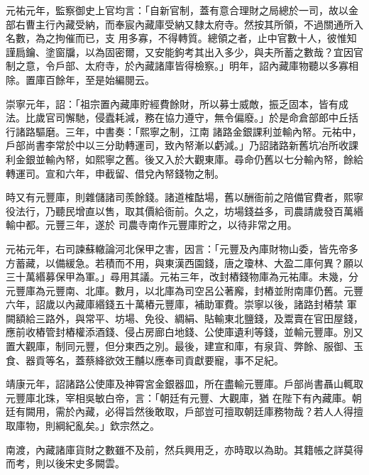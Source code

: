 \begin{pinyinscope}
 元祐元年，監察御史上官均言：「自新官制，蓋有意合理財之局總於一司，故以金部右曹主行內藏受納，而奉宸內藏庫受納又隸太府寺。然按其所領，不過關通所入名數，為之拘催而已，支
 用多寡，不得轉質。總領之者，止中官數十人，彼惟知謹扃鑰、塗窗牖，以為固密爾，又安能鉤考其出入多少，與夫所蓄之數哉？宜因官制之意，令戶部、太府寺，於內藏諸庫皆得檢察。」明年，詔內藏庫物聽以多寡相除。置庫百餘年，至是始編閱云。



 崇寧元年，詔：「祖宗置內藏庫貯經費餘財，所以募士威敵，振乏固本，皆有成法。比歲官司懈馳，侵蠹耗減，務在協力遵守，無令偏廢。」於是命倉部郎中丘括行諸路驅磨。三年，中書奏：「熙寧之制，江南
 諸路金銀課利並輸內帑。元祐中，戶部尚書李常於中以三分助轉運司，致內帑漸以虧減。」乃詔諸路新舊坑冶所收課利金銀並輸內帑，如熙寧之舊。後又入於大觀東庫。尋命仍舊以七分輸內帑，餘給轉運司。宣和六年，申截留、借兌內帑錢物之制。



 時又有元豐庫，則雜儲諸司羨餘錢。諸道榷酤場，舊以酬衙前之陪備官費者，熙寧役法行，乃聽民增直以售，取其價給衙前。久之，坊場錢益多，司農請歲發百萬緡輸中都。元豐三年，遂於
 司農寺南作元豐庫貯之，以待非常之用。



 元祐元年，右司諫蘇轍論河北保甲之害，因言：「元豐及內庫財物山委，皆先帝多方蓄藏，以備緩急。若積而不用，與東漢西園錢，唐之瓊林、大盈二庫何異？願以三十萬緡募保甲為軍。」尋用其議。元祐三年，改封樁錢物庫為元祐庫。未幾，分元豐庫為元豐南、北庫。數月，以北庫為司空呂公著廨，封樁並附南庫仍舊。元豐六年，詔歲以內藏庫緡錢五十萬樁元豐庫，補助軍費。崇寧以後，諸路封樁禁
 軍闕額給三路外，與常平、坊場、免役、綢絹、貼輸東北鹽錢，及鬻賣在官田屋錢，應前收樁管封樁權添酒錢、侵占房廊白地錢、公使庫遺利等錢，並輸元豐庫。別又置大觀庫，制同元豐，但分東西之別。最後，建宣和庫，有泉貨、弊餘、服御、玉食、器貢等名，蓋蔡絳欲效王黼以應奉司貢獻要寵，事不足紀。



 靖康元年，詔諸路公使庫及神霄宮金銀器皿，所在盡輸元豐庫。戶部尚書聶山輒取元豐庫北珠，宰相吳敏白帝，言：「朝廷有元豐、大觀庫，猶
 在陛下有內藏庫。朝廷有闕用，需於內藏，必得旨然後敢取，戶部豈可擅取朝廷庫務物哉？若人人得擅取庫物，則綱紀亂矣。」欽宗然之。



 南渡，內藏諸庫貨財之數雖不及前，然兵興用乏，亦時取以為助。其籍帳之詳莫得而考，則以後宋史多闕雲。



\end{pinyinscope}